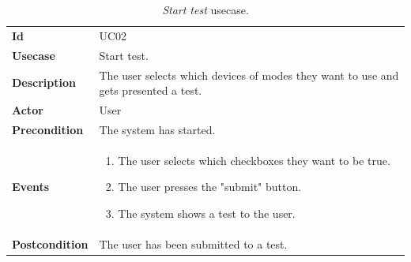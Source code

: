 \begin{table}[h!t]
    \centering
    \caption{\emph{Start test} usecase.}
    \label{tab:uc:test}
    \centering
    \begin{tabular}{l | p{80mm}}
        \textbf{Id}            & UC02                                                                                \\
        \textbf{Usecase}       & Start test.                                                                         \\
        \textbf{Description}   & The user selects which devices of modes they want to use and gets presented a test. \\
        \textbf{Actor}         & User                                                                                \\
        \textbf{Precondition}  & The system has started.                                                             \\
        \textbf{Events}        & \begin{enumerate}
            \item The user selects which checkboxes they want to be true.
            \item The user presses the "submit" button.
            \item The system shows a test to the user.
        \end{enumerate}                                                          \\
        \textbf{Postcondition} & The user has been submitted to a test.
    \end{tabular}
\end{table}

